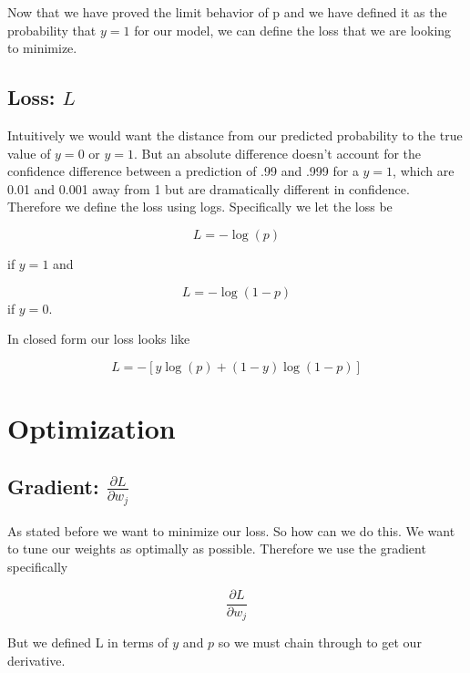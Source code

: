 \documentclass{article}
\theoremstyle{remark}
\begin{document}
Now that we have proved the limit behavior of p and we have defined it as the probability
that $y = 1$ for our model, we can define the loss that we are looking to minimize.

\subsection{Loss: $L$}

Intuitively we would want the distance from our predicted probability
to the true value of $y=0$ or $y=1$. But an absolute difference 
doesn't account for the confidence difference between a prediction of .99 
and .999 for a $y=1$, which are 0.01 and 0.001 away from 1 but are dramatically
different in confidence. Therefore we define the loss using logs. Specifically we
let the loss be

\begin{equation*}
L = -\log\!\left(p\right)
\end{equation*}

if $y=1$ and 

\begin{equation*}
L  = -\log\!\left(1 - p\right)
\end{equation*}
if $y=0$. 

In closed form our loss looks like 

\begin{equation}
    L = -[y\log\!\left(p\right) + (1 - y)\log\!\left(1-p\right)]
\end{equation}

\section{Optimization}

\subsection{Gradient: $\frac{\partial L}{\partial w_j}$}

As stated before we want to minimize our loss. So how can we do this. 
We want to tune our weights as optimally as possible. Therefore
we use the gradient specifically 

\begin{equation*}
\frac{\partial L}{\partial w_j}
\end{equation*}

But we defined L in terms of $y$ and $p$ 
so we must chain through to get our derivative.
\end{document}
